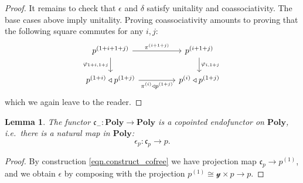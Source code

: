 \documentclass[11pt, one side, article]{memoir}
\theoremstyle{definition}
\theoremstyle{plain}
\newtheorem{lemma}[definitionx]{Lemma}
\newcommand{\Cat}[1]{\mathbf{#1}}%
\newcommand{\yon}{\mathcal{y}}
\newcommand{\poly}{\Cat{Poly}}
\newcommand{\tri}{\mathbin{\triangleleft}}
\newcommand{\cofree}{\mathfrak{c}}
\newcommand{\coh}[1]{^{(#1)}}
\begin{document}
\begin{proof}
It remains to check that $\epsilon$ and $\delta$ satisfy unitality and coassociativity. The base cases above imply unitality. Proving coassociativity amounts to proving that the following square commutes for any $i,j$:
\[
\begin{tikzcd}[column sep=45pt]
	p\coh{1+i+1+j}\ar[r, "\pi\coh{i+1+j}"]\ar[d, "\varphi_{1+i,1+j}"']&
	p\coh{i+1+j}\ar[d, "\varphi_{i,1+j}"]\\
	p\coh{1+i}\tri p\coh{1+j}\ar[r, "\pi\coh{i}\tri p\coh{1+j}"']&
	p\coh{i}\tri p\coh{1+j}
\end{tikzcd}
\]
which we again leave to the reader.
\end{proof}

\begin{lemma}\label{lemma.copointed}
The functor $\cofree_-\colon\poly\to\poly$ is a copointed endofunctor on $\poly$, i.e.\ there is a natural map in $\poly$:
\[\epsilon_p\colon\cofree_p\to p.\]
\end{lemma}
\begin{proof}
By construction \eqref{eqn.construct_cofree} we have projection map $\cofree_p\to p\coh{1}$, and we obtain $\epsilon$ by composing with the projection $p\coh{1}\cong\yon\times p\to p$.
\end{proof}
\end{document}
